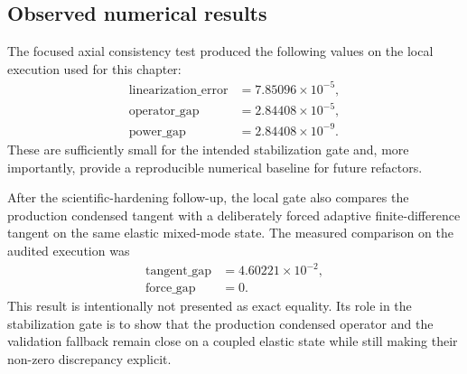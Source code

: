 \subsection{Observed numerical results}

The focused axial consistency test produced the following values on the local
execution used for this chapter:
\begin{align}
  \text{linearization\_error} &= 7.85096\times 10^{-5}, \\
  \text{operator\_gap} &= 2.84408\times 10^{-5}, \\
  \text{power\_gap} &= 2.84408\times 10^{-9}.
\end{align}
These are sufficiently small for the intended stabilization gate and, more
importantly, provide a reproducible numerical baseline for future refactors.

After the scientific-hardening follow-up, the local gate also compares the
production condensed tangent with a deliberately forced adaptive
finite-difference tangent on the same elastic mixed-mode state.  The measured
comparison on the audited execution was
\begin{align}
  \text{tangent\_gap} &= 4.60221\times 10^{-2}, \\
  \text{force\_gap} &= 0.
\end{align}
This result is intentionally not presented as exact equality.  Its role in the
stabilization gate is to show that the production condensed operator and the
validation fallback remain close on a coupled elastic state while still making
their non-zero discrepancy explicit.

